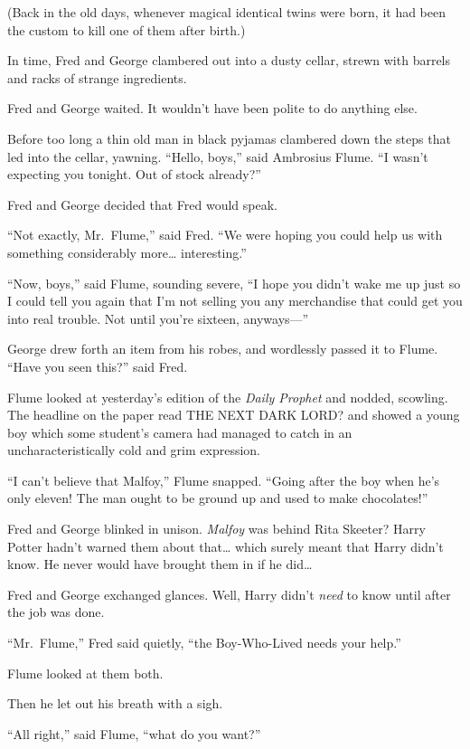 (Back in the old days, whenever magical identical twins were born, it
had been the custom to kill one of them after birth.)

In time, Fred and George clambered out into a dusty cellar, strewn with
barrels and racks of strange ingredients.

Fred and George waited. It wouldn't have been polite to do anything
else.

Before too long a thin old man in black pyjamas clambered down the steps
that led into the cellar, yawning. ``Hello, boys,'' said Ambrosius
Flume. ``I wasn't expecting you tonight. Out of stock already?''

Fred and George decided that Fred would speak.

``Not exactly, Mr.~Flume,'' said Fred. ``We were hoping you could help
us with something considerably more\ldots{} interesting.''

``Now, boys,'' said Flume, sounding severe, ``I hope you didn't wake me
up just so I could tell you again that I'm not selling you any
merchandise that could get you into real trouble. Not until you're
sixteen, anyways---''

George drew forth an item from his robes, and wordlessly passed it to
Flume. ``Have you seen this?'' said Fred.

Flume looked at yesterday's edition of the \emph{Daily Prophet} and
nodded, scowling. The headline on the paper read THE NEXT DARK LORD? and
showed a young boy which some student's camera had managed to catch in
an uncharacteristically cold and grim expression.

``I can't believe that Malfoy,'' Flume snapped. ``Going after the boy
when he's only eleven! The man ought to be ground up and used to make
chocolates!''

Fred and George blinked in unison. \emph{Malfoy} was behind Rita
Skeeter? Harry Potter hadn't warned them about that\ldots{} which surely
meant that Harry didn't know. He never would have brought them in if he
did\ldots{}

Fred and George exchanged glances. Well, Harry didn't \emph{need} to
know until after the job was done.

``Mr.~Flume,'' Fred said quietly, ``the Boy-Who-Lived needs your help.''

Flume looked at them both.

Then he let out his breath with a sigh.

``All right,'' said Flume, ``what do you want?''

